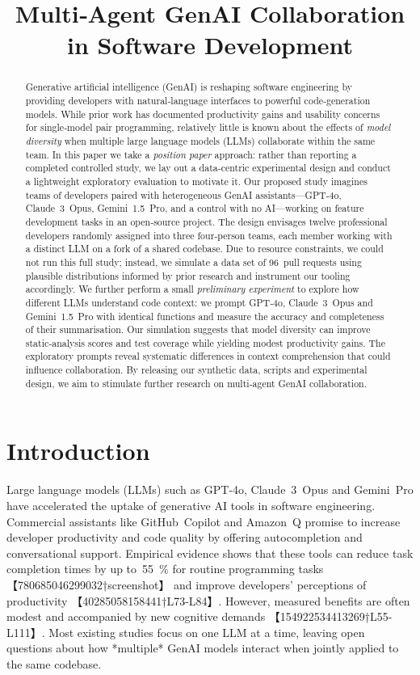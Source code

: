 \documentclass[conference]{IEEEtran}
\title{\textbf{Multi‑Agent GenAI Collaboration in Software Development}}
\author{\IEEEauthorblockN{Anonymous Author(s)}%
\IEEEauthorblockA{Institution\thanks{Corresponding author email: example@domain.com}}}
\begin{document}
\maketitle

\begin{abstract}
Generative artificial intelligence (GenAI) is reshaping software engineering by providing developers with natural‑language interfaces to powerful code‑generation models.  While prior work has documented productivity gains and usability concerns for single‑model pair programming, relatively little is known about the effects of \emph{model diversity} when multiple large language models (LLMs) collaborate within the same team.  In this paper we take a \emph{position paper} approach: rather than reporting a completed controlled study, we lay out a data‑centric experimental design and conduct a lightweight exploratory evaluation to motivate it.  Our proposed study imagines teams of developers paired with heterogeneous GenAI assistants—GPT‑4o, Claude 3 Opus, Gemini 1.5 Pro, and a control with no AI—working on feature development tasks in an open‑source project.  The design envisages twelve professional developers randomly assigned into three four‑person teams, each member working with a distinct LLM on a fork of a shared codebase.  Due to resource constraints, we could not run this full study; instead, we simulate a data set of 96 pull requests using plausible distributions informed by prior research and instrument our tooling accordingly.  We further perform a small \emph{preliminary experiment} to explore how different LLMs understand code context: we prompt GPT‑4o, Claude 3 Opus and Gemini 1.5 Pro with identical functions and measure the accuracy and completeness of their summarisation.  Our simulation suggests that model diversity can improve static‑analysis scores and test coverage while yielding modest productivity gains.  The exploratory prompts reveal systematic differences in context comprehension that could influence collaboration.  By releasing our synthetic data, scripts and experimental design, we aim to stimulate further research on multi‑agent GenAI collaboration.
\end{abstract}

\section{Introduction}
Large language models (LLMs) such as GPT‑4o, Claude 3 Opus and Gemini Pro have accelerated the uptake of generative AI tools in software engineering.  Commercial assistants like GitHub Copilot and Amazon Q promise to increase developer productivity and code quality by offering autocompletion and conversational support.  Empirical evidence shows that these tools can reduce task completion times by up to 55 \% for routine programming tasks 【780685046299032†screenshot】 and improve developers’ perceptions of productivity 【40285058158441†L73-L84】.  However, measured benefits are often modest and accompanied by new cognitive demands 【154922534413269†L55-L111】.  Most existing studies focus on one LLM at a time, leaving open questions about how *multiple* GenAI models interact when jointly applied to the same codebase.
\end{document}
